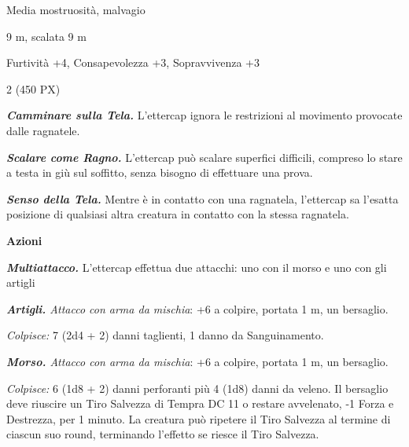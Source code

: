\begin{multicols}{2}
{
\begin{description}[noitemsep, topsep=0pt, parsep=0pt, partopsep=0pt, itemsep=1pt, leftmargin=2.35cm,  labelwidth=2.2cm, itemindent=0cm, listparindent=0pt] %
\setlength{\baselineskip}{10pt}
\item[\textbf{Taglia/Tipo}] Media mostruosità, malvagio
\item[\textbf{Caratt.}] 
\item[\textbf{Punti Ferita}] 
\item[\textbf{Movimento}] 9 m, scalata 9 m
\item[\textbf{Tiri Salvez.}] 
\item[\textbf{Comp.}] Furtività +4, Consapevolezza +3, Sopravvivenza +3
\item[\textbf{Sensi}] 
\item[\textbf{Sfida}] 2 (450 PX)
\end{description}
\smallskip

\emph{\textbf{Camminare sulla Tela.}} L'ettercap ignora le restrizioni al movimento provocate dalle ragnatele.

\emph{\textbf{Scalare come Ragno.}} L'ettercap può scalare superfici difficili, compreso lo stare a testa in giù sul soffitto, senza bisogno di effettuare una prova.

\emph{\textbf{Senso della Tela.}} Mentre è in contatto con una ragnatela, l'ettercap sa l'esatta posizione di qualsiasi altra creatura in contatto con la stessa ragnatela.

\textbf{Azioni}

\emph{\textbf{Multiattacco.}} L'ettercap effettua due attacchi: uno con il morso e uno con gli artigli

\emph{\textbf{Artigli.} Attacco con arma da mischia}: +6 a colpire, portata 1 m, un bersaglio.

\emph{Colpisce:} 7 (2d4 + 2) danni taglienti, 1 danno da Sanguinamento.

\emph{\textbf{Morso.} Attacco con arma da mischia}: +6 a colpire, portata 1 m, un bersaglio.

\emph{Colpisce:} 6 (1d8 + 2) danni perforanti più 4 (1d8) danni da veleno. Il bersaglio deve riuscire un Tiro Salvezza di Tempra DC 11 o restare avvelenato, -1 Forza e Destrezza, per 1 minuto. La creatura può ripetere il Tiro Salvezza al termine di ciascun suo round, terminando l'effetto se riesce il Tiro Salvezza.

}
\end{multicols}
